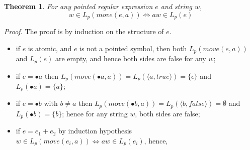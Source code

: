 \documentclass[preprint]{sigplanconf}
\newcommand{\false}{\mathit{false}}
\newcommand{\Lp}[1]{L_p(#1)}
\newcounter{item}
\newtheorem{theorem}[item]{Theorem}
\newenvironment{proof}{\begin{trivlist}\item[]{\em Proof.}}{\end{trivlist}}
\begin{document}
\begin{theorem} 
\label{theo:move}
For any pointed regular expression $e$ and string
$w$, 
\[w \in \Lp{move(e,a)} \Leftrightarrow aw \in  \Lp e \]
\end{theorem}

\begin{proof}
The proof is by induction on the structure of $e$. 
\begin{itemize}
\item if $e$ is atomic, and $e$ is not a pointed symbol, then
both $\Lp{move(e,a)}$ and $\Lp e$ are empty, and hence both
sides are false for any $w$;
\item if $e = \bullet a$ then 
$\Lp{move(\bullet a,a)} = \Lp{\langle a,true\rangle} = \{\epsilon\}$
and $\Lp{\bullet a} = \{a\}$; 
\item if $e = \bullet b$ with $b \neq a$ then 
$\Lp{move(\bullet b,a)} = \Lp{\langle b,\false\rangle} = \emptyset$
and $\Lp{\bullet b} = \{b\}$; hence for any string $w$, both sides 
are false; 
\item if $e = e_1 + e_2$
by induction hypothesis
$w \in \Lp{move(e_i,a)} \Leftrightarrow aw \in \Lp{e_i}$,
hence, 


\end{itemize}
\end{proof}
\end{document}
